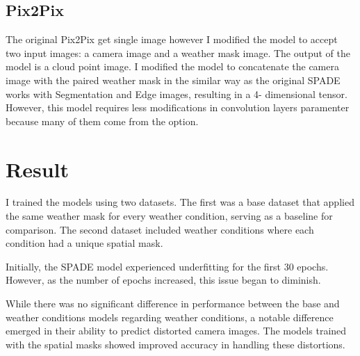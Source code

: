 \subsection{Pix2Pix}
The original Pix2Pix get single image however I modified the model to accept two input images: a camera image and a weather mask image. The output of the model is a cloud point image.
I modified the model to concatenate the camera image with the paired weather mask in the
similar way as the original SPADE works with Segmentation and Edge images, resulting in a 4-
dimensional tensor. However, this model requires less modifications in convolution layers paramenter because many of them come from the option.

\section{Result}
I trained the models using two datasets. The first was a base dataset that applied the same weather mask for every weather condition, serving as a baseline for comparison. The second dataset included weather conditions where each condition had a unique spatial mask.

Initially, the SPADE model experienced underfitting for the first 30 epochs. However, as the number of epochs increased, this issue began to diminish.

While there was no significant difference in performance between the base and weather conditions models regarding weather conditions, a notable difference emerged in their ability to predict distorted camera images. The models trained with the spatial masks showed improved accuracy in handling these distortions.

